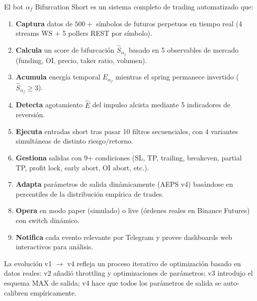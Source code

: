 \documentclass[11pt,a4paper]{article}
\newcommand{\af}{\alpha_f}
\newcommand{\score}{\hat{S}_{\alpha_f}}
\newcommand{\energy}{E_{\alpha_f}}
\newcommand{\exh}{\hat{E}}
\begin{document}
El bot $\af$ Bifurcation Short es un sistema completo de trading
automatizado que:

\begin{enumerate}[leftmargin=2em]
\item \textbf{Captura} datos de $500+$ s\'imbolos de futuros perpetuos
  en tiempo real (4 streams WS + 5 pollers REST por s\'imbolo).
\item \textbf{Calcula} un score de bifurcaci\'on $\score$ basado en
  5 observables de mercado (funding, OI, precio, taker ratio, volumen).
\item \textbf{Acumula} energ\'ia temporal $\energy$ mientras el spring
  permanece invertido ($\score \geq 3$).
\item \textbf{Detecta} agotamiento $\exh$ del impulso alcista mediante
  5 indicadores de reversi\'on.
\item \textbf{Ejecuta} entradas short tras pasar 10 filtros secuenciales,
  con 4 variantes simult\'aneas de distinto riesgo/retorno.
\item \textbf{Gestiona} salidas con 9+ condiciones (SL, TP, trailing,
  breakeven, partial TP, profit lock, early abort, OI abort, etc.).
\item \textbf{Adapta} par\'ametros de salida din\'amicamente (AEPS v4)
  bas\'andose en percentiles de la distribuci\'on emp\'irica de trades.
\item \textbf{Opera} en modo paper (simulado) o live (\'ordenes reales
  en Binance Futures) con switch din\'amico.
\item \textbf{Notifica} cada evento relevante por Telegram y provee
  dashboards web interactivos para an\'alisis.
\end{enumerate}

La evoluci\'on v1 $\to$ v4 refleja un proceso iterativo de optimizaci\'on
basado en datos reales: v2 a\~nadi\'o throttling y optimizaciones de par\'ametros;
v3 introdujo el esquema MAX de salida; v4 hace que todos los par\'ametros
de salida se auto-calibren emp\'iricamente.
\end{document}
